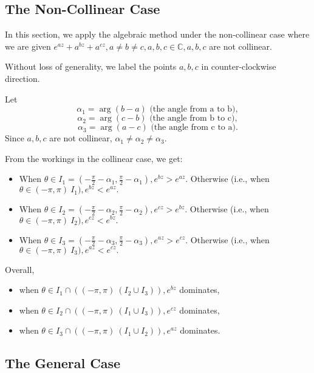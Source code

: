 \documentclass[11pt,reqno,oneside,a4paper]{article}
\begin{document}
\subsection{The Non-Collinear Case}\label{subsec:algnoncol}

In this section, we apply the algebraic method under the non-collinear case where we are given $e^{az}+a^{bz} + a^{cz}, a\neq b \neq c, a,b,c \in \mathbb{C}, a,b,c$ are not collinear.

Without loss of generality, we label the points $a,b,c$ in counter-clockwise direction. 

Let 
$$\alpha_1 = \arg(b-a) \text{ (the angle from a to b)},$$
$$\alpha_2 = \arg(c-b) \text{ (the angle from b to c)},$$
$$\alpha_3 = \arg(a-c) \text{ (the angle from c to a)}.$$
Since $a,b,c$ are not collinear, $\alpha_1 \neq \alpha_2 \neq \alpha_3.$

From the workings in the collinear case, we get:
\begin{itemize}
	\item When $\theta \in I_1 = \left(-\frac{\pi}{2} - \alpha_1, \frac{\pi}{2}-\alpha_1\right), e^{bz}>e^{az}.$
	Otherwise (i.e., when $\theta \in (-\pi,\pi)\ I_1), e^{bz}<e^{az}.$
	
	\item When $\theta \in I_2 = \left(-\frac{\pi}{2} - \alpha_2, \frac{\pi}{2}-\alpha_2\right), e^{cz}>e^{bz}.$
	Otherwise (i.e., when $\theta \in (-\pi,\pi)\ I_2),  e^{cz}<e^{bz}.$
	
	\item When $\theta \in I_3 = \left(-\frac{\pi}{2} - \alpha_3, \frac{\pi}{2}-\alpha_3\right), e^{az}>e^{cz}.$
	Otherwise (i.e., when $\theta \in (-\pi,\pi)\ I_3),  e^{az}<e^{cz}.$
\end{itemize}

Overall, 
\begin{itemize}
	\item when $\theta \in I_1 \cap \left((-\pi,\pi) \ (I_2\cup I_3)\right), e^{bz}$ dominates,
	\item when $\theta \in I_2 \cap \left((-\pi,\pi) \ (I_1\cup I_3)\right), e^{cz}$ dominates,
	\item when $\theta \in I_3 \cap \left((-\pi,\pi) \ (I_1	\cup I_2)\right), e^{az}$ dominates.
\end{itemize}

\subsection{The General Case}\label{subsec:alggen}
\end{document}
